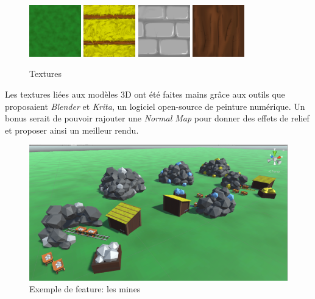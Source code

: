\documentclass[12pt]{report}
\begin{document}
\begin{figure}[H]
    \centering
    \includegraphics[width=0.2\textwidth]{plain}
    \includegraphics[width=0.2\textwidth]{straw_roof}
    \includegraphics[width=0.2\textwidth]{wall}
    \includegraphics[width=0.2\textwidth]{wood}
    \caption{Textures}
\end{figure}

Les textures liées aux modèles 3D ont été faites mains grâce aux outils que proposaient \textit{Blender} et \textit{Krita}, un logiciel open-source de peinture numérique. Un bonus serait de pouvoir rajouter une \textit{Normal Map} pour donner des effets de relief et proposer ainsi un meilleur rendu.

\begin{figure}[H]
    \centering
    \includegraphics[scale=0.8]{mines}
    \caption{Exemple de feature: les mines}
\end{figure}
\end{document}
